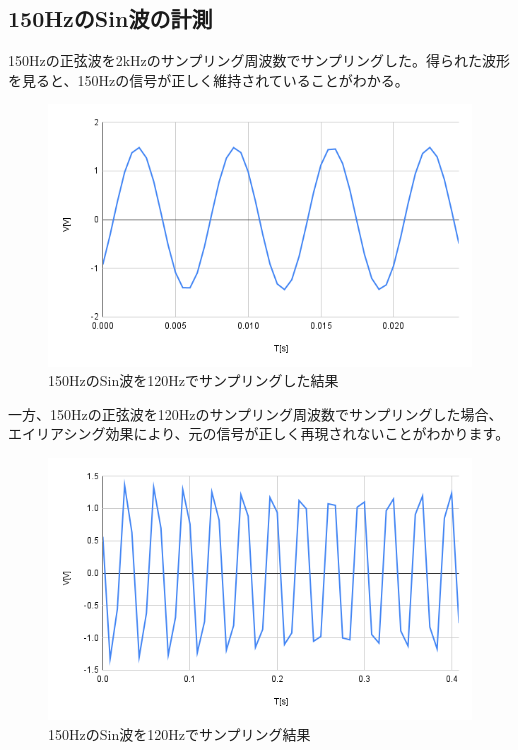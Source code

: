 \documentclass[a4paper,11pt,xelatex,ja=standard]{bxjsarticle}
\begin{document}
    \subsection{150HzのSin波の計測}

        150Hzの正弦波を2kHzのサンプリング周波数でサンプリングした。得られた波形を見ると、150Hzの信号が正しく維持されていることがわかる。
        \begin{figure}[H]
            \centering
            \includegraphics[width=1.0\textwidth]{./img/24-4-2/150HzのSin波を2kHzでサンプリング.png}
            \caption{150HzのSin波を120Hzでサンプリングした結果}
        \end{figure}

        一方、150Hzの正弦波を120Hzのサンプリング周波数でサンプリングした場合、エイリアシング効果により、元の信号が正しく再現されないことがわかります。

        \begin{figure}[H]
            \centering
            \includegraphics[width=1.0\textwidth]{./img/24-4-2/150HzのSin波を120Hzでサンプリング.png}
            \caption{150HzのSin波を120Hzでサンプリング結果}
        \end{figure}
\end{document}
